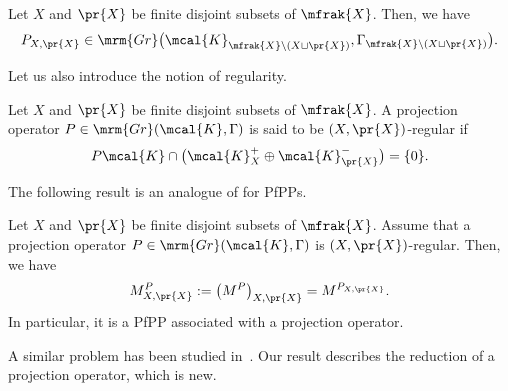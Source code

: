\begin{Lemma}\label{lem:conditional_projection}
Let $X$ and $\pr{X}$ be finite disjoint subsets of $\mfrak{X}$. Then, we have
\begin{equation*}
	P_{X,\pr{X}}\in\mrm{Gr}\big(\mcal{K}_{\mfrak{X}\backslash(X\sqcup\pr{X})},\Gamma_{\mfrak{X}\backslash (X\sqcup\pr{X})}\big).
\end{equation*}
\end{Lemma}

 Let us also introduce the notion of regularity.
 \begin{Definition} Let $X$ and $\pr{X}$ be finite disjoint subsets of $\mfrak{X}$.
 A projection operator $P\in \mrm{Gr}(\mcal{K},\Gamma)$ is said to be $(X,\pr{X})$-regular if
 \begin{equation*}
 	P\mcal{K}\cap \big(\mcal{K}_{X}^{+}\oplus \mcal{K}_{\pr{X}}^{-}\big)=\{0\}.
 \end{equation*}
 \end{Definition}

 The following result is an analogue of \cite[Proposition~6.13]{Olshanski2020} for PfPPs.
 \begin{Theorem}\label{thm:conditional_projection}
 Let $X$ and $\pr{X}$ be finite disjoint subsets of $\mfrak{X}$.
 Assume that a projection operator $P\in\mrm{Gr}(\mcal{K},\Gamma)$ is $(X,\pr{X})$-regular.
 Then, we have
 \begin{equation*}
 	M^{P}_{X,\pr{X}}:=\big(M^{P}\big)_{X,\pr{X}}=M^{P_{X,\pr{X}}}.
 \end{equation*}
 In particular, it is a PfPP associated with a projection operator.
 \end{Theorem}

 \begin{Remark}
A similar problem has been studied in~\cite{BufetovCundenQiu2019}. Our result describes the reduction of a projection operator, which is new.
 \end{Remark}
